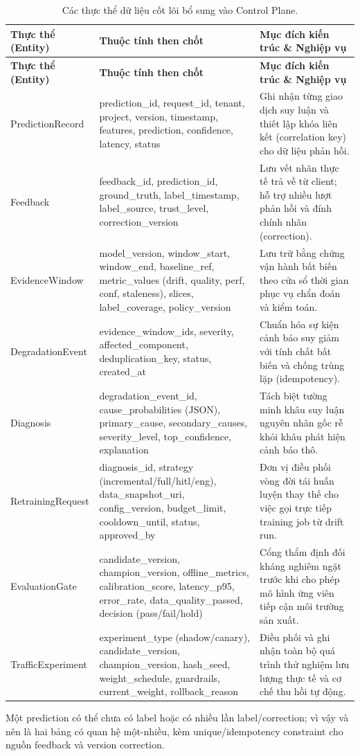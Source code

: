\begin{xltabular}{\linewidth}{@{}L{3.2cm} L{5.4cm} Y@{}}
\caption{Các thực thể dữ liệu cốt lõi bổ sung vào Control Plane.}\label{tab:state-model}\\
\toprule
\textbf{Thực thể (Entity)} & \textbf{Thuộc tính then chốt} & \textbf{Mục đích kiến trúc \& Nghiệp vụ} \\
\midrule
\endfirsthead
\toprule
\textbf{Thực thể (Entity)} & \textbf{Thuộc tính then chốt} & \textbf{Mục đích kiến trúc \& Nghiệp vụ} \\
\midrule
\endhead
PredictionRecord & prediction\_id, request\_id, tenant, project, version, timestamp, features, prediction, confidence, latency, status & Ghi nhận từng giao dịch suy luận và thiết lập khóa liên kết (correlation key) cho dữ liệu phản hồi. \\
\addlinespace
Feedback & feedback\_id, prediction\_id, ground\_truth, label\_timestamp, label\_source, trust\_level, correction\_version & Lưu vết nhãn thực tế trả về từ client; hỗ trợ nhiều lượt phản hồi và đính chính nhãn (correction). \\
\addlinespace
EvidenceWindow & model\_version, window\_start, window\_end, baseline\_ref, metric\_values (drift, quality, perf, conf, staleness), slices, label\_coverage, policy\_version & Lưu trữ bằng chứng vận hành bất biến theo cửa sổ thời gian phục vụ chẩn đoán và kiểm toán. \\
\addlinespace
DegradationEvent & evidence\_window\_ids, severity, affected\_component, deduplication\_key, status, created\_at & Chuẩn hóa sự kiện cảnh báo suy giảm với tính chất bất biến và chống trùng lặp (idempotency). \\
\addlinespace
Diagnosis & degradation\_event\_id, cause\_probabilities (JSON), primary\_cause, secondary\_causes, severity\_level, top\_confidence, explanation & Tách biệt tường minh khâu suy luận nguyên nhân gốc rễ khỏi khâu phát hiện cảnh báo thô. \\
\addlinespace
RetrainingRequest & diagnosis\_id, strategy (incremental/full/hitl/eng), data\_snapshot\_uri, config\_version, budget\_limit, cooldown\_until, status, approved\_by & Đơn vị điều phối vòng đời tái huấn luyện thay thế cho việc gọi trực tiếp training job từ drift run. \\
\addlinespace
EvaluationGate & candidate\_version, champion\_version, offline\_metrics, calibration\_score, latency\_p95, error\_rate, data\_quality\_passed, decision (pass/fail/hold) & Cổng thẩm định đối kháng nghiêm ngặt trước khi cho phép mô hình ứng viên tiếp cận môi trường sản xuất. \\
\addlinespace
TrafficExperiment & experiment\_type (shadow/canary), candidate\_version, champion\_version, hash\_seed, weight\_schedule, guardrails, current\_weight, rollback\_reason & Điều phối và ghi nhận toàn bộ quá trình thử nghiệm lưu lượng thực tế và cơ chế thu hồi tự động. \\
\bottomrule
\end{xltabular}

Một prediction có thể chưa có label hoặc có nhiều lần label/correction; vì vậy  và  nên là hai bảng có quan hệ một-nhiều, kèm unique/idempotency constraint cho nguồn feedback và version correction.
